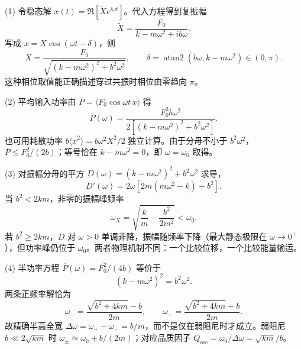 (1) 令稳态解 \(x(t)=\Re[\tilde X e^{i\omega t}]\)。代入方程得到复振幅
\[
\tilde X=\frac{F_0}{k-m\omega^2+i b\omega}.
\]
写成 \(x=X\cos(\omega t-\delta)\)，则
\[
X=\frac{F_0}{\sqrt{(k-m\omega^2)^2+b^2\omega^2}},\qquad
\delta=\operatorname{atan2}(b\omega,k-m\omega^2)\in(0,\pi).
\]
这种相位取值能正确描述穿过共振时相位由零趋向 \(\pi\)。

(2) 平均输入功率由 \(\overline P=\langle F_0\cos\omega t\,\dot x\rangle\) 得
\[
\overline P(\omega)=\frac{F_0^2 b\omega^2}{2[(k-m\omega^2)^2+b^2\omega^2]}.
\]
也可用耗散功率 \(b\langle\dot x^2\rangle=b\omega^2X^2/2\) 独立计算。由于分母不小于 \(b^2\omega^2\)，\(\overline P\le F_0^2/(2b)\)；等号恰在 \(k-m\omega^2=0\)，即 \(\omega=\omega_0\) 取得。

(3) 对振幅分母的平方 \(D(\omega)=(k-m\omega^2)^2+b^2\omega^2\) 求导，
\[
D'(\omega)=2\omega[2m(m\omega^2-k)+b^2].
\]
当 \(b^2<2km\)，非零的振幅峰频率
\[
\omega_X=\sqrt{\frac{k}{m}-\frac{b^2}{2m^2}}<\omega_0.
\]
若 \(b^2\ge2km\)，\(D\) 对 \(\omega>0\) 单调非降，振幅随频率下降（最大静态极限在 \(\omega\to0^+\)），但功率峰仍位于 \(\omega_0\)。两者物理机制不同：一个比较位移，一个比较能量输运。

(4) 半功率方程 \(\overline P(\omega)=F_0^2/(4b)\) 等价于
\[
(k-m\omega^2)^2=b^2\omega^2 .
\]
两条正频率解恰为
\[
\omega_-=\frac{\sqrt{b^2+4km}-b}{2m},\qquad
\omega_+=\frac{\sqrt{b^2+4km}+b}{2m}.
\]
故精确半高全宽 \(\Delta\omega=\omega_+-\omega_-=b/m\)，而不是仅在弱阻尼时才成立。弱阻尼 \(b\ll2\sqrt{km}\) 时 \(\omega_\pm\simeq\omega_0\pm b/(2m)\)；对应品质因子 \(Q_{\mathrm{osc}}=\omega_0/\Delta\omega=\sqrt{km}/b\)。
